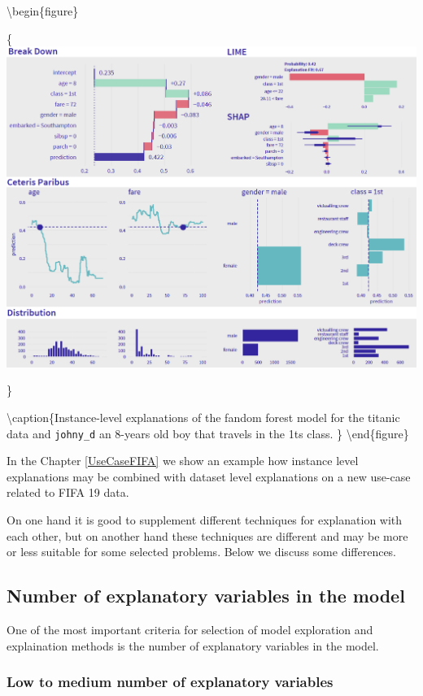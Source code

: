 \documentclass[12pt,]{krantz}
\begin{document}
\textbackslash{}begin\{figure\}

\{\centering \includegraphics[width=1\linewidth]{figure/instance_level}

\}

\textbackslash{}caption\{Instance-level explanations of the fandom forest model for the titanic data and \texttt{johny\_d} an 8-years old boy that travels in the 1ts class. \}\label{fig:instanceLevelExplainers}
\textbackslash{}end\{figure\}

In the Chapter \ref{UseCaseFIFA} we show an example how instance level explanations may be combined with dataset level explanations on a new use-case related to FIFA 19 data.

On one hand it is good to supplement different techniques for explanation with each other, but on another hand these techniques are different and may be more or less suitable for some selected problems. Below we discuss some differences.

\hypertarget{number-of-explanatory-variables-in-the-model}{%
\subsection{Number of explanatory variables in the model}\label{number-of-explanatory-variables-in-the-model}}

One of the most important criteria for selection of model exploration and explaination methods is the number of explanatory variables in the model.

\hypertarget{low-to-medium-number-of-explanatory-variables}{%
\subsubsection{Low to medium number of explanatory variables}\label{low-to-medium-number-of-explanatory-variables}}
\end{document}
